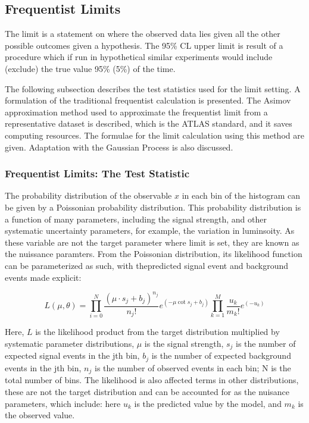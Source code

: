 

\subsection{Frequentist Limits}
\label{sec:freq}
The limit is a statement on where the observed data lies given all the other possible outcomes given a hypothesis. The 95\% CL upper limit is result of a procedure which if run in hypothetical similar experiments would include (exclude) the true value 95\% (5\%) of the time.

The following subsection describes the test statistics used for the limit setting. A formulation of the traditional frequentist calculation is presented. The Asimov approximation method used to approximate the frequentist limit from a representative dataset is described, which is the ATLAS standard, and it saves computing resources. The formulae for the limit calculation using this method are given. Adaptation with the Gaussian Process is also discussed. 

\subsubsection{Frequentist Limits: The Test Statistic}
\label{sec:freqTestStats}

The probability distribution of the observable $x$ in each bin of the histogram can be given by a Poissonian probability distribution. This probability distribution is a function of many parameters, including the signal strength, and other systematic uncertainty parameters, for example, the variation in luminsoity. As these variable are not the target parameter where limit is set, they are known as the nuissance paramters. From the Poissonian distribution, its likelihood function can be parameterized as such, with thepredicted signal event and background events made explicit:

\begin{equation}
    L(\mu, \theta) =  \prod_{i=0}^{N} \frac{(\mu \cdot s_{j} + b_{j})^{n_j}}{n_{j}!}e^{(-\mu \cot s_j + b_j)} \prod_{k=1}^{M}\frac{u_{k}}
{m_{k}!} e^{(-u_{k})}
\label{eq:likelihood}
\end{equation}

Here, $L$ is the likelihood product from the target distribution multiplied by systematic parameter distributions, $\mu$ is the signal strength, $s_j$ is the number of expected signal events in the jth bin, $b_j$ is the number of expected background events in the jth  bin, $n_j$ is the number of observed events in each bin; N is the total number of bins. The likelihood is also affected terms in other distributions, these
are not the target distribution and can be accounted for as the nuisance parameters, which
include: here $u_k$ is the predicted value by the model, and $m_{k}$ is the observed value. 

